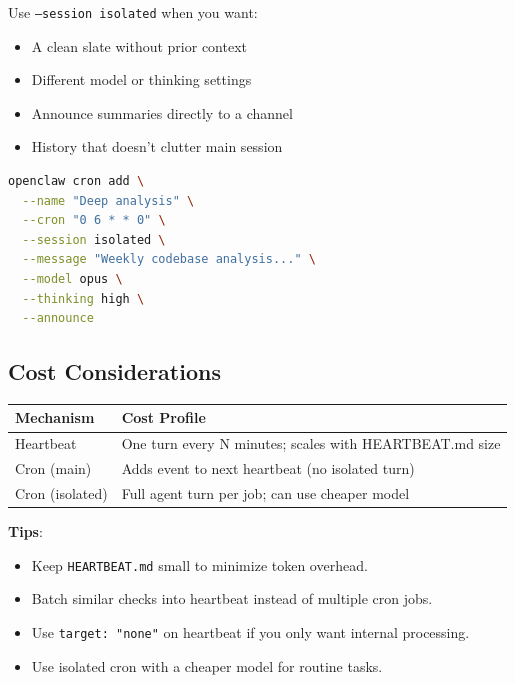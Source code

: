 Use \texttt{--session isolated} when you want:

\begin{itemize}
  \item A clean slate without prior context
  \item Different model or thinking settings
  \item Announce summaries directly to a channel
  \item History that doesn't clutter main session
\end{itemize}


\begin{lstlisting}[language=bash]
openclaw cron add \
  --name "Deep analysis" \
  --cron "0 6 * * 0" \
  --session isolated \
  --message "Weekly codebase analysis..." \
  --model opus \
  --thinking high \
  --announce
\end{lstlisting}


\subsection{Cost Considerations}



\begin{table}[h]
\centering
\small
\begin{tabular}{|l|l|}
\hline
Mechanism & Cost Profile \\
\hline
Heartbeat & One turn every N minutes; scales with HEARTBEAT.md size \\
\hline
Cron (main) & Adds event to next heartbeat (no isolated turn) \\
\hline
Cron (isolated) & Full agent turn per job; can use cheaper model \\
\hline
\end{tabular}
\end{table}



\textbf{Tips}:

\begin{itemize}
  \item Keep \texttt{HEARTBEAT.md} small to minimize token overhead.
  \item Batch similar checks into heartbeat instead of multiple cron jobs.
  \item Use \texttt{target: "none"} on heartbeat if you only want internal processing.
  \item Use isolated cron with a cheaper model for routine tasks.
\end{itemize}


